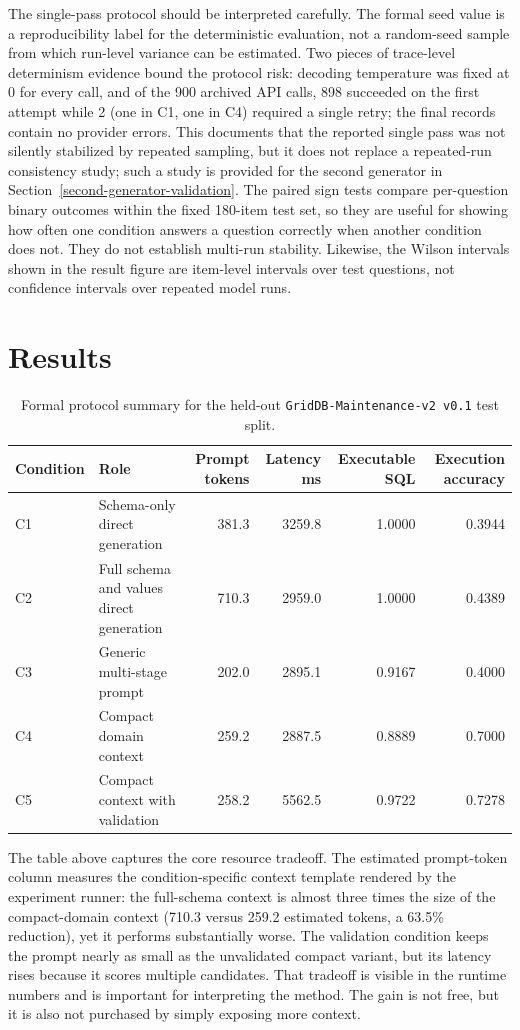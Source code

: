 \documentclass{ieeeaccess}
\begin{document}
The single-pass protocol should be interpreted carefully. The formal seed value is a reproducibility label for the deterministic evaluation, not a random-seed sample from which run-level variance can be estimated. Two pieces of trace-level determinism evidence bound the protocol risk: decoding temperature was fixed at 0 for every call, and of the 900 archived API calls, 898 succeeded on the first attempt while 2 (one in C1, one in C4) required a single retry; the final records contain no provider errors. This documents that the reported single pass was not silently stabilized by repeated sampling, but it does not replace a repeated-run consistency study; such a study is provided for the second generator in Section~\ref{second-generator-validation}. The paired sign tests compare per-question binary outcomes within the fixed 180-item test set, so they are useful for showing how often one condition answers a question correctly when another condition does not. They do not establish multi-run stability. Likewise, the Wilson intervals shown in the result figure are item-level intervals over test questions, not confidence intervals over repeated model runs.

\section{Results}\label{results}

\begin{table}[t]
\caption{Formal protocol summary for the held-out \texttt{GridDB-Maintenance-v2 v0.1} test split.}
\centering
\small
\begin{tabular*}{\textwidth}{@{\extracolsep{\fill}}llrrrr}
\toprule
Condition & Role & Prompt tokens & Latency ms & Executable SQL & Execution accuracy \\
\midrule
C1 & Schema-only direct generation & 381.3 & 3259.8 & 1.0000 & 0.3944 \\
C2 & Full schema and values direct generation & 710.3 & 2959.0 & 1.0000 & 0.4389 \\
C3 & Generic multi-stage prompt & 202.0 & 2895.1 & 0.9167 & 0.4000 \\
C4 & Compact domain context & 259.2 & 2887.5 & 0.8889 & 0.7000 \\
C5 & Compact context with validation & 258.2 & 5562.5 & 0.9722 & 0.7278 \\
\bottomrule
\end{tabular*}
\end{table}

The table above captures the core resource tradeoff. The estimated prompt-token column measures the condition-specific context template rendered by the experiment runner: the full-schema context is almost three times the size of the compact-domain context (710.3 versus 259.2 estimated tokens, a 63.5\% reduction), yet it performs substantially worse. The validation condition keeps the prompt nearly as small as the unvalidated compact variant, but its latency rises because it scores multiple candidates. That tradeoff is visible in the runtime numbers and is important for interpreting the method. The gain is not free, but it is also not purchased by simply exposing more context.
\end{document}
